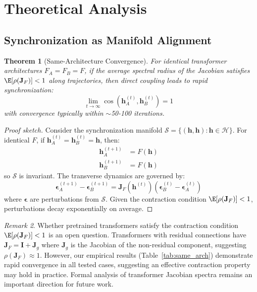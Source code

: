 \documentclass[10pt]{article} %
\theoremstyle{plain}
\newtheorem{theorem}{Theorem}[section]
\theoremstyle{definition}
\theoremstyle{remark}
\newtheorem{remark}[theorem]{Remark}
\newcommand{\cH}{\mathcal{H}}
\newcommand{\cS}{\mathcal{S}}
\renewcommand{\vect}[1]{\bm{#1}}
\newcommand{\mat}[1]{\mathbf{#1}}
\begin{document}
\section{Theoretical Analysis}

\subsection{Synchronization as Manifold Alignment}

\begin{theorem}[Same-Architecture Convergence]
\label{thm:convergence}
For identical transformer architectures $F_A = F_B = F$, if the average spectral radius of the Jacobian satisfies $\E[\rho(\mat{J}_F)] < 1$ along trajectories, then direct coupling leads to rapid synchronization:
\begin{equation}
    \lim_{t \to \infty} \cos(\vect{h}_A^{(t)}, \vect{h}_B^{(t)}) = 1
\end{equation}
with convergence typically within $\sim$50-100 iterations.
\end{theorem}

\begin{proof}[Proof sketch]
Consider the synchronization manifold $\cS = \{(\vect{h}, \vect{h}) : \vect{h} \in \cH\}$. For identical $F$, if $\vect{h}_A^{(t)} = \vect{h}_B^{(t)} = \vect{h}$, then:
\begin{align}
    \vect{h}_A^{(t+1)} &= F(\vect{h}) \\
    \vect{h}_B^{(t+1)} &= F(\vect{h})
\end{align}
so $\cS$ is invariant. The transverse dynamics are governed by:
\begin{equation}
    \vect{\epsilon}_A^{(t+1)} - \vect{\epsilon}_B^{(t+1)} = \mat{J}_F(\vect{h}^{(t)}) (\vect{\epsilon}_B^{(t)} - \vect{\epsilon}_A^{(t)})
\end{equation}
where $\vect{\epsilon}$ are perturbations from $\cS$. Given the contraction condition $\E[\rho(\mat{J}_F)] < 1$, perturbations decay exponentially on average.
\end{proof}

\begin{remark}
Whether pretrained transformers satisfy the contraction condition $\E[\rho(\mat{J}_F)] < 1$ is an open question. Transformers with residual connections have $\mat{J}_F = \mat{I} + \mat{J}_g$ where $\mat{J}_g$ is the Jacobian of the non-residual component, suggesting $\rho(\mat{J}_F) \approx 1$. However, our empirical results (Table~\ref{tab:same_arch}) demonstrate rapid convergence in all tested cases, suggesting an effective contraction property may hold in practice. Formal analysis of transformer Jacobian spectra remains an important direction for future work.
\end{remark}
\end{document}
